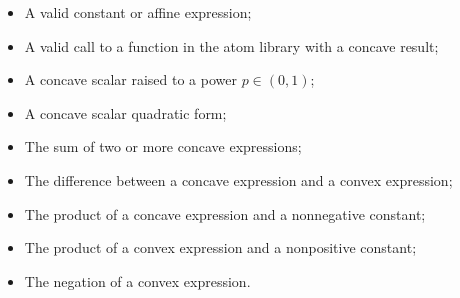 \documentclass{article}
\begin{document}
\begin{itemize}
\begin{itemize}
		      \item A valid constant or affine expression;
		      \item A valid call to a function in the atom library with a concave result;
		      \item A concave scalar raised to a power \(p\in(0,1)\);
		      \item A concave scalar quadratic form;
		      \item The sum of two or more concave expressions;
		      \item The difference between a concave expression and a convex expression;
		      \item The product of a concave expression and a nonnegative constant;
		      \item The product of a convex expression and a nonpositive constant;
		      \item The negation of a convex expression.
	      \end{itemize}
\end{itemize}
\end{document}
